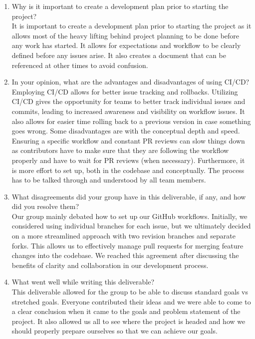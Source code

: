 \begin{enumerate}
\item Why is it important to create a development plan prior to starting the
project?\\

It is important to create a development plan prior to starting the project as
it allows most of the heavy lifting behind project planning to be done before any
work has started. It allows for expectations and workflow to be clearly defined before
any issues arise. It also creates a document that can be referenced at other times 
to avoid confusion.

\item In your opinion, what are the advantages and disadvantages of using
CI/CD?\\

Employing CI/CD allows for better issue tracking and rollbacks. Utilizing CI/CD gives the
opportunity for teams to better track individual issues and commits, leading to increased 
awareness and visibility on workflow issues. It also allows for easier time rolling back
to a previous version in case something goes wrong. 
Some disadvantages are with the conceptual depth and speed. Ensuring a specific workflow 
and constant PR reviews can slow things down as contributors have to make sure that they
are following the workflow properly and have to wait for PR reviews (when necessary). Furthermore,
it is more effort to set up, both in the codebase and conceptually. The process has to be 
talked through and understood by all team members.

\item What disagreements did your group have in this deliverable, if any,
and how did you resolve them?\\

Our group mainly debated how to set up our GitHub workflows. Initially, we considered using individual branches for each issue, but we ultimately decided on a 
more streamlined approach with two revision branches and separate forks. This allows us to effectively manage pull requests for merging feature changes into the codebase. 
We reached this agreement after discussing the benefits of clarity and collaboration in our development process.

\item What went well while writing this deliverable? \\

This deliverable allowed for the group to be able to discuss standard goals vs stretched goals. Everyone contributed their ideas and we were able to come to a clear conclusion 
when it came to the goals and problem statement of the project. It also allowed us all to see where the project is headed and how we should properly prepare
 ourselves so that we can achieve our goals. 


\end{enumerate}
